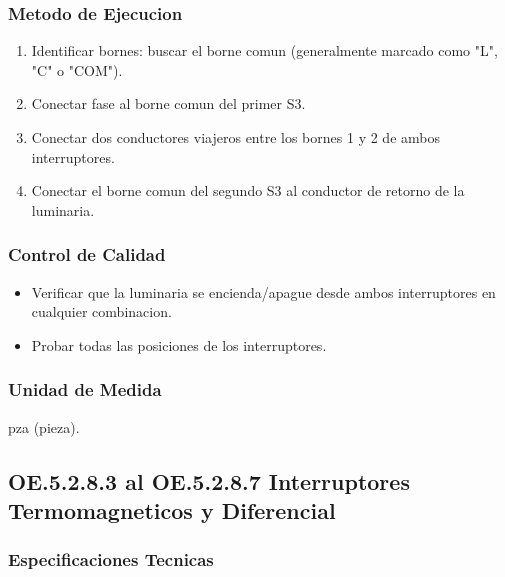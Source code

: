 \subsubsection{Metodo de Ejecucion}

\begin{enumerate}
  \item Identificar bornes: buscar el borne comun (generalmente marcado como "L", "C" o "COM").
  \item Conectar fase al borne comun del primer S3.
  \item Conectar dos conductores viajeros entre los bornes 1 y 2 de ambos interruptores.
  \item Conectar el borne comun del segundo S3 al conductor de retorno de la luminaria.
\end{enumerate}

\subsubsection{Control de Calidad}

\begin{itemize}
  \item Verificar que la luminaria se encienda/apague desde ambos interruptores en cualquier combinacion.
  \item Probar todas las posiciones de los interruptores.
\end{itemize}

\subsubsection{Unidad de Medida}

pza (pieza).

\subsection{OE.5.2.8.3 al OE.5.2.8.7 Interruptores Termomagneticos y Diferencial}

\subsubsection{Especificaciones Tecnicas}

